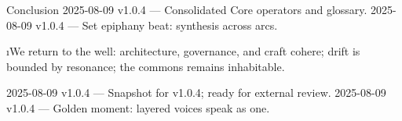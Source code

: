 
\begin{SectionHeaderLedger}{Conclusion}
        2025-08-09 v1.0.4 — Consolidated Core operators and glossary.
   2025-08-09 v1.0.4 — Set epiphany beat: synthesis across arcs.
\end{SectionHeaderLedger}

\i{We return to the well}: architecture, governance, and craft cohere; drift is bounded by resonance; the commons remains inhabitable.

\begin{SectionFooterLedger}
 2025-08-09 v1.0.4 — Snapshot for v1.0.4; ready for external review.
    2025-08-09 v1.0.4 — Golden moment: layered voices speak as one.
\end{SectionFooterLedger}
\endinput
